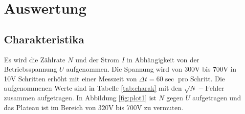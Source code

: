 \section{Auswertung}
\label{sec:Auswertung}

\subsection{Charakteristika}
\label{sec:charak}

Es wird die Zählrate $N$ und der Strom $I$ in Abhängigkeit von der Betriebsspannung $U$ aufgenommen.
Die Spannung wird von 300V bis 700V in 10V Schritten erhöht mit einer Messzeit von $\Delta t = 60 \si{\sec}$ pro Schritt.
Die aufgenommenen Werte sind in Tabelle \ref{tab:charak} mit den $\sqrt{N}-\text{Fehler}$ zusammen aufgetragen.
In Abbildung \ref{fig:plot1} ist $N$ gegen $U$ aufgetragen und das Plateau ist im Bereich von 320V bis 700V zu vermuten. 

